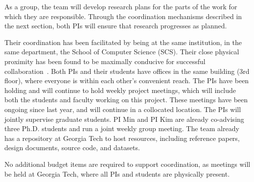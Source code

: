 \vspace{1em}
As a group, the team will develop research plans for the parts of the
work for which they are responsible. Through the coordination
mechanisms described in the next section, both PIs will ensure that
research progresses as planned.

\vspace{1em}
Their coordination has been facilitated by being at the same
institution, in the same department, the School of Computer Science
(SCS). Their close physical proximity has been found to be maximally
conducive for successful collaboration~\cite{Olson:2000:DM}. Both PIs
and their students have offices in the same building (3rd floor),
where everyone is within each other's convenient reach. The PIs have
been holding
and will continue to hold weekly project meetings, which will include
both the students and faculty working on this project.
These meetings have been ongoing since last year, and will continue in
a collocated location. The PIs will jointly supervise graduate students.
PI Min and PI Kim are already co-advising three Ph.D. students and run
a joint weekly group meeting. The team already has a  repository at
Georgia Tech to host resources, including reference papers, design
documents, source code, and datasets.


\vspace{1em}
No additional budget items are required to support coordination, as
meetings will be held at Georgia Tech, where all PIs and students are physically
present.
